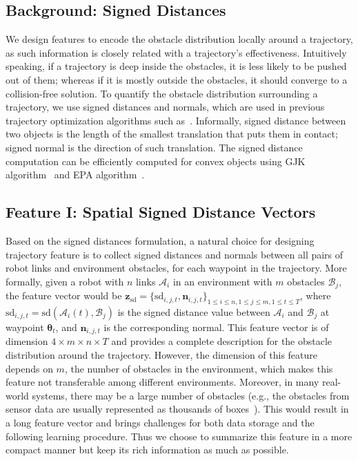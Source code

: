 \documentclass[letterpaper, 10 pt, conference]{ieeeconf}  %
\newcommand{\btheta}{\mbox{$\bm \theta$}}
\newcommand{\fsd}{\mbox{$\mathbf z_{\text{sd}}$}}
\begin{document}
\subsection{Background: Signed Distances}
We design features to encode the obstacle distribution locally around a trajectory, as such information is closely related with a trajectory's effectiveness. Intuitively speaking, if a trajectory is deep inside the obstacles, it is less likely to be pushed out of them; whereas if it is mostly outside the obstacles, it should converge to a collision-free solution. To quantify the obstacle distribution surrounding a trajectory, we use signed distances and normals, which are used in previous trajectory optimization algorithms such as~\cite{Schulman:2013:FLO}. Informally, signed distance between two objects is the length of the smallest translation that puts them in contact; signed normal is the direction of such translation. The signed distance computation can be efficiently computed for convex objects using GJK algorithm~\cite{Gilbert:1988:GJK} and EPA algorithm~\cite{Bergen:2001:EPA}. 


\subsection{Feature I: Spatial Signed Distance Vectors}
Based on the signed distances formulation, a natural choice for designing trajectory feature is to collect signed distances and normals between all pairs of robot links and environment obstacles, for each waypoint in the trajectory. More formally, given a robot with $n$ links $\mathcal A_i$ in an environment with $m$ obstacles $\mathcal B_j$, the feature vector would be $\fsd = \{\text{sd}_{i,j,t}, \mathbf n_{i,j,t}\}_{1\leq i \leq n, 1\leq j \leq m, 1\leq t \leq T}$, where $\text{sd}_{i,j,t} = \text{sd}(\mathcal A_i(t), \mathcal B_j)$ is the signed distance value between $\mathcal A_i$ and $\mathcal B_j$ at waypoint $\btheta_t$, and $\mathbf n_{i,j,t}$ is the corresponding normal. This feature vector is of dimension $4\times m \times n \times T$ and provides a complete description for the obstacle distribution around the trajectory. However, the dimension of this feature depends on $m$, the number of obstacles in the environment, which makes this feature not transferable among different environments. Moreover, in many real-world systems, there may be a large number of obstacles (e.g., the obstacles from sensor data are usually represented as thousands of boxes~\cite{Sucan:2010:CPT}). This would result in a long feature vector and brings challenges for both data storage and the following learning procedure. Thus we choose to summarize this feature in a more compact manner but keep its rich information as much as possible. 
\end{document}
